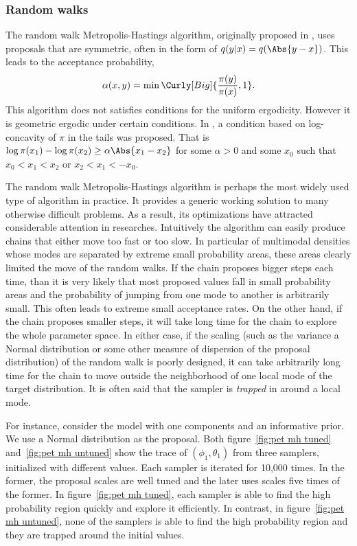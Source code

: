 \subsubsection{Random walks}
\label{ssub:Random walks}

The random walk Metropolis-Hastings algorithm, originally proposed in
\cite{Metropolis:1953ex}, uses proposals that are symmetric, often in the form
of $q(y|x) = q(\Abs{y - x})$. This leads to the acceptance probability,
\begin{equation}
  \alpha(x,y) = \min\Curly[Big]{\frac{\pi(y)}{\pi(x)},1}.
\end{equation}
This algorithm does not satisfies conditions for the uniform ergodicity.
However it is geometric ergodic under certain conditions. In
\cite{Mengersen:1996th}, a condition based on log-concavity of $\pi$ in the
tails was proposed. That is $\log\pi(x_1) - \log\pi(x_2) \ge \alpha\Abs{x_1 -
  x_2}$ for some $\alpha > 0$ and some $x_0$ such that $x_0 < x_1 < x_2$ or
$x_2 < x_1 < -x_0$.

The random walk Metropolis-Hastings algorithm is perhaps the most widely used
type of \mcmc algorithm in practice. It provides a generic working solution to
many otherwise difficult problems. As a result, its optimizations have
attracted considerable attention in researches. Intuitively the algorithm can
easily produce chains that either move too fast or too slow. In particular of
multimodal densities whose modes are separated by extreme small probability
areas, these areas clearly limited the move of the random walks. If the chain
proposes bigger steps each time, than it is very likely that most proposed
values fall in small probability areas and the probability of jumping from one
mode to another is arbitrarily small. This often leads to extreme small
acceptance rates. On the other hand, if the chain proposes smaller steps, it
will take long time for the chain to explore the whole parameter space. In
either case, if the scaling (such as the variance a Normal distribution or
some other measure of dispersion of the proposal distribution) of the random
walk is poorly designed, it can take arbitrarily long time for the chain to
move outside the neighborhood of one local mode of the target distribution. It
is often said that the sampler is \emph{trapped} in around a local mode.

For instance, consider the \pet model with one components and an informative
prior. We use a Normal distribution as the proposal. Both figure~\ref{fig:pet
  mh tuned} and~\ref{fig:pet mh untuned} show the trace of $(\phi_1,
\theta_1)$ from three samplers, initialized with different values. Each
sampler is iterated for 10,000 times. In the former, the proposal scales are
well tuned and the later uses scales five times of the former. In
figure~\ref{fig:pet mh tuned}, each sampler is able to find the high
probability region quickly and explore it efficiently. In contrast, in
figure~\ref{fig:pet mh untuned}, none of the samplers is able to find the high
probability region and they are trapped around the initial values.

